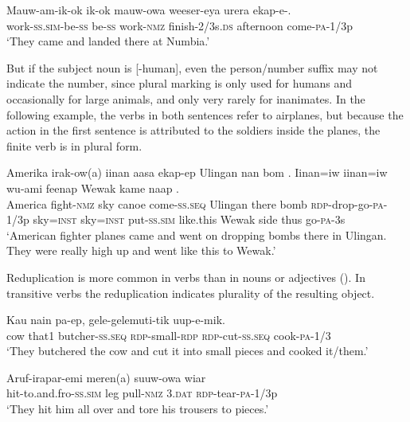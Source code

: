 \ea%
\label{ex:x1296}
\gll Mauw-am-ik-ok  ik-ok  mauw-owa  weeser-eya urera  ekap-e-.\\
work-\textsc{ss}.\textsc{sim}-be-\textsc{ss}  be-\textsc{ss}  work-\textsc{nmz}  finish-2/3s.\textsc{ds} afternoon  come-\textsc{pa}-1/3p\\
\glt `They came and landed there at Numbia.'
\z

But if the subject noun is [-human], even the person/number suffix may not indicate the number, since plural marking is only used for humans and occasionally for large animals, and only very rarely for inanimates. In the following example, the verbs in both sentences refer to airplanes, but because the action in the first sentence is attributed to the soldiers inside the planes, the finite verb is in plural form. 

\ea%
\label{ex:x1283}
\gll Amerika  irak-ow(a)  iinan  aasa  ekap-ep  Ulingan  nan  bom .  Iinan=iw  iinan=iw  wu-ami  feenap Wewak  kame  naap  .\\
America  fight-\textsc{nmz}  sky  canoe  come-\textsc{ss}.\textsc{seq}  Ulingan  there  bomb \textsc{rdp}-drop-go-\textsc{pa}-1/3p  sky=\textsc{inst}  sky=\textsc{inst}  put-\textsc{ss}.\textsc{sim}  like.this Wewak  side  thus  go-\textsc{pa}-3s\\
\glt `American fighter planes came and went on dropping bombs there in Ulingan. They were really high up and went like this to Wewak.'
\z

Reduplication is more common in verbs than in nouns or adjectives (). In transitive verbs the reduplication indicates plurality of the resulting object. 

\ea%
\label{ex:x1298}
\gll Kau  nain  pa-ep,  gele-gelemuti-tik \textstyleEmphasizedVernacularWords{-}  uup-e-mik.\\
cow  that1  butcher-\textsc{ss}.\textsc{seq}  \textsc{rdp}-small-\textsc{rdp} \textsc{rdp}-cut-\textsc{ss}.\textsc{seq}  cook-\textsc{pa}-1/3\\
\glt `They butchered the cow and cut it into small pieces and cooked it/them.'
\z

\ea%
\label{ex:x1297}
\gll Aruf-irapar-emi  meren(a)  suuw-owa  wiar \\
hit-to.and.fro-\textsc{ss}.\textsc{sim}  leg  pull-\textsc{nmz}  3.\textsc{dat} \textsc{rdp}-tear-\textsc{pa}-1/3p\\
\glt `They hit him all over and tore his trousers to pieces.'
\z

